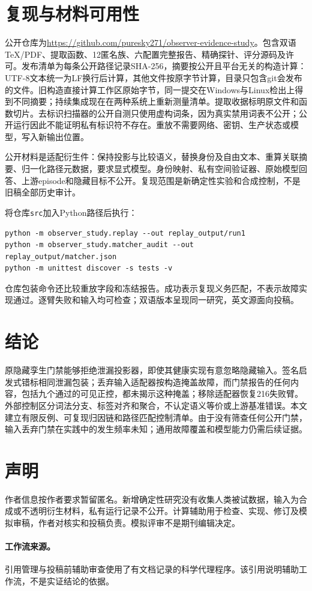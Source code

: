\documentclass[UTF8,11pt]{ctexart}
\begin{document}
\section{复现与材料可用性}
公开仓库为\url{https://github.com/puresky271/observer-evidence-study}。包含双语TeX/PDF、提取函数、12匿名族、六配置完整报告、精确探针、评分源码及许可。发布清单为每条公开路径记录SHA-256，摘要按公开且平台无关的构造计算：UTF-8文本统一为LF换行后计算，其他文件按原字节计算，目录只包含git会发布的文件。旧构造直接计算工作区原始字节，同一提交在Windows与Linux检出上得到不同摘要；持续集成现在在两种系统上重新测量清单。提取收据标明原文件和函数切片。去标识扫描器的公开自测只使用虚构词条，因为真实禁用词表不公开；公开运行因此不能证明私有标识符不存在。重放不需要网络、密钥、生产状态或模型，写入新输出位置。

公开材料是适配衍生件：保持投影与比较语义，替换身份及自由文本、重算关联摘要、归一化路径元数据，要求显式模型。身份映射、私有空间验证器、原始模型回答、上游episode和隐藏目标不公开。复现范围是新确定性实验和合成控制，不是旧稿全部历史审计。

将仓库\texttt{src}加入Python路径后执行：
\begin{lstlisting}
python -m observer_study.replay --out replay_output/run1
python -m observer_study.matcher_audit --out replay_output/matcher.json
python -m unittest discover -s tests -v
\end{lstlisting}
仓库包装命令还比较重放字段和冻结报告。成功表示复现义务匹配，不表示故障实现通过。逐臂失败和输入均可检查；双语版本呈现同一研究，英文源面向投稿。

\section{结论}
原隐藏孪生门禁能够拒绝泄漏投影器，即使其健康实现有意忽略隐藏输入。签名启发式错标相同泄漏包装；丢弃输入适配器按构造掩盖故障，而门禁报告的任何内容，包括九个通过的可见正控，都未揭示这种掩盖；移除适配器恢复216失败臂。外部控制区分词法分支、标签对齐和聚合，不认定语义等价或上游基准错误。本文建立有限反例、可复现归因链和路径匹配控制清单。由于没有筛查任何公开门禁，输入丢弃门禁在实践中的发生频率未知；通用故障覆盖和模型能力仍需后续证据。

\section*{声明}
作者信息按作者要求暂留匿名。新增确定性研究没有收集人类被试数据，输入为合成或不透明衍生材料，私有运行记录不公开。计算辅助用于检查、实现、修订及模拟审稿，作者对核实和投稿负责。模拟评审不是期刊编辑决定。
\paragraph{工作流来源。} 引用管理与投稿前辅助审查使用了有文档记录的科学代理程序\cite{skills}。该引用说明辅助工作流，不是实证结论的依据。
\clearpage
\small


\end{document}
